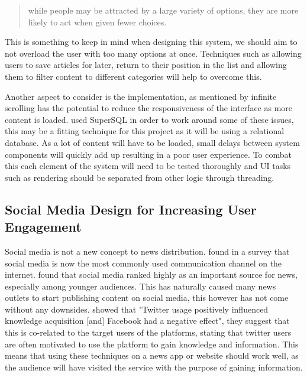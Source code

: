 \documentclass[12pt,titlepage]{article}
\begin{document}
  \begin{quote}
    while people may be attracted by a large variety of options, they are more
    likely to act when given fewer choices.
  \end{quote}

  This is something to keep in mind when designing this system, we should aim to
  not overload the user with too many options at once. Techniques such as
  allowing users to save articles for later, return to their position in the
  list and allowing them to filter content to different categories will help to
  overcome this.

  Another aspect to consider is the implementation, as mentioned by
  \cite{newtarget} infinite scrolling has the potential to reduce the
  responsiveness of the interface as more content is loaded. \cite{tajima} used
  SuperSQL in order to work around some of these issues, this may be a fitting
  technique for this project as it will be using a relational database. As a lot
  of content will have to be loaded, small delays between system components will
  quickly add up resulting in a poor user experience. To combat this each
  element of the system will need to be tested thoroughly and UI tasks such as
  rendering should be separated from other logic through threading.

  \subsection{Social Media Design for Increasing User Engagement}

  Social media is not a new concept to news distribution. \cite{standley} found
  in a survey that social media is now the most commonly used communication
  channel on the internet. \cite{boukes} found that social media ranked highly
  as an important source for news, especially among younger audiences. This has
  naturally caused many news outlets to start publishing content on social
  media, this however has not come without any downsides. \cite{boukes} showed
  that "Twitter usage positively influenced knowledge acquisition [and] Facebook
  had a negative effect", they suggest that this is co-related to the target
  users of the platforms, stating that twitter users are often motivated to use
  the platform to gain knowledge and information. This means that using these
  techniques on a news app or website should work well, as the audience will have
  visited the service with the purpose of gaining information.
\end{document}
